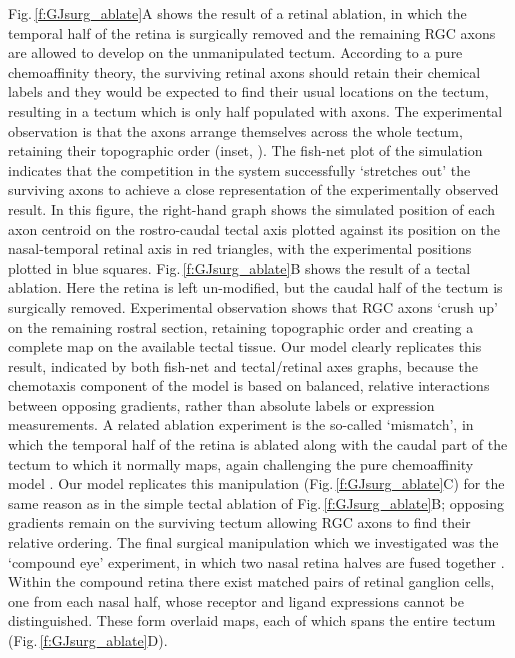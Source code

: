\documentclass[11pt, a4paper]{article}
\begin{document}
Fig.\,\ref{f:GJsurg_ablate}A shows the result of a retinal ablation, in which the temporal half of the retina is surgically removed and the remaining RGC axons are allowed to develop on the unmanipulated tectum.
According to a pure chemoaffinity theory, the surviving retinal axons should retain their chemical labels and they would be expected to find their usual locations on the tectum, resulting in a tectum which is only half populated with axons. 
The experimental observation is that the axons arrange themselves across the whole tectum, retaining their topographic order (inset, \citet{attardi_preferential_1963,schmidt_expansion_1978}). 
The fish-net plot of the simulation indicates that the competition in the system successfully `stretches out' the surviving axons to achieve a close representation of the experimentally observed result. 
In this figure, the right-hand graph shows the simulated position of each axon centroid on the rostro-caudal tectal axis plotted against its position on the nasal-temporal retinal axis in red triangles, with the experimental positions plotted in blue squares.
%
Fig.\,\ref{f:GJsurg_ablate}B shows the result of a tectal ablation. Here the retina is left un-modified, but the caudal half of the tectum is surgically removed. Experimental observation \citep{yoon_reorganization_1971,sharma_reformation_1972} shows that RGC axons `crush up' on the remaining rostral section, retaining topographic order and creating a complete map on the available tectal tissue. Our model clearly replicates this result, indicated by both fish-net and tectal/retinal axes graphs, because the chemotaxis component of the model is based on balanced, relative interactions between opposing gradients, rather than absolute labels or expression measurements.
%
A related ablation experiment is the so-called `mismatch', in which the temporal half of the retina is ablated along with the caudal part of the tectum to which it normally maps, again challenging the pure chemoaffinity model \citep{horder_retention_1971}. Our model replicates this manipulation (Fig.\,\ref{f:GJsurg_ablate}C) for the same reason as in the simple tectal ablation of Fig.\,\ref{f:GJsurg_ablate}B; opposing gradients remain on the surviving tectum allowing RGC axons to find their relative ordering.
%
The final surgical manipulation which we investigated was the `compound eye' experiment, in which two nasal retina halves are fused together \citep{gaze_retino-tectal_1963,fawcett_retinotectal_1982}. Within the compound retina there exist matched pairs of retinal ganglion cells, one from each nasal half, whose receptor and ligand expressions cannot be distinguished. These form overlaid maps, each of which spans the entire tectum (Fig.\,\ref{f:GJsurg_ablate}D).
\end{document}
